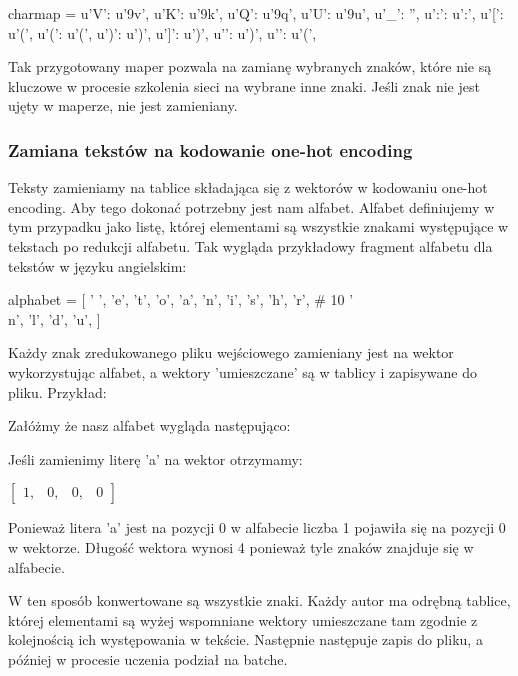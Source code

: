 \begin{python}
charmap = {
    u'V': u'\xb9v',     
    u'K': u'\xb9k',         
    u'Q': u'\xb9q',        
    u'U': u'\xb9u',   
    u'_': '',             
    u':': u':',             
    u'[': u'(',           
    u'(': u'(',               
    u')': u')',              
    u']': u')',              
    u'}': u')',              
    u'{': u'(',                 
}
\end{python}

Tak przygotowany maper pozwala na zamianę wybranych znaków, które nie są kluczowe w procesie 
szkolenia sieci na wybrane inne znaki. Jeśli znak nie jest ujęty w maperze, nie jest zamieniany. 

\subsubsection{Zamiana tekstów na kodowanie one-hot encoding}
Teksty zamieniamy na tablice składająca się z wektorów w kodowaniu one-hot encoding. 
Aby tego dokonać potrzebny jest nam alfabet. Alfabet definiujemy w tym przypadku jako listę, której 
elementami są wszystkie znakami występujące w tekstach po redukcji alfabetu. Tak wygląda przykładowy fragment alfabetu dla tekstów
 w języku angielskim:
\begin{python}
alphabet = [
    ' ',
    'e',
    't',
    'o',
    'a',
    'n',
    'i',
    's',
    'h',
    'r',  # 10
    '\\n',
    'l',
    'd',
    'u',
]
\end{python}

Każdy znak zredukowanego pliku wejściowego zamieniany jest na wektor wykorzystując alfabet, 
a wektory 'umieszczane' są w tablicy i zapisywane do pliku. Przykład:

Załóżmy że nasz alfabet wygląda następująco:

Jeśli zamienimy literę 'a' na wektor otrzymamy: 
 
\vspace{2mm}
$
\begin{bmatrix} 
1, & 0, & 0, & 0
\end{bmatrix} 
$
\vspace{2mm}

Ponieważ litera 'a' jest na pozycji 0 w alfabecie liczba 1 pojawiła się na pozycji 0 w wektorze.
Długość wektora wynosi 4 ponieważ tyle znaków znajduje się w alfabecie.

W ten sposób konwertowane są wszystkie znaki.
Każdy autor ma odrębną tablice, której elementami są wyżej wspomniane wektory umieszczane tam zgodnie 
z kolejnością ich występowania w tekście. 
Następnie następuje zapis do pliku, a później w procesie uczenia podział na batche.